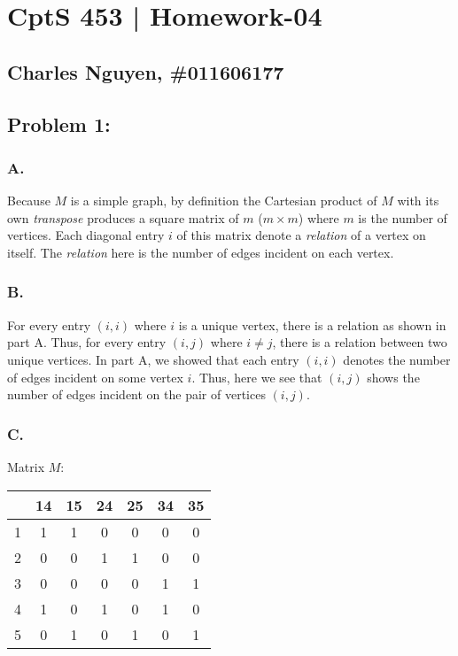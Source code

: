 \documentclass[12pt,letterpaper]{article}
\begin{document}
\section*{CptS 453 | Homework-04 }
\subsection*{Charles Nguyen, \#011606177 }

\subsection*{Problem 1:}
\subsubsection*{A.}
Because $M$ is a simple graph, by definition the Cartesian product of $M$ with
its own \emph{transpose} produces a square matrix of $m$ ($m \times m$) where
$m$ is the number of vertices.  Each diagonal entry $i$ of this matrix denote
a \emph{relation} of a vertex on itself. The \emph{relation} here is the
number of edges incident on each vertex.

\subsubsection*{B.}
For every entry $(i, i)$ where $i$ is a unique vertex, there is a relation
as shown in part A. Thus, for every entry $(i, j)$ where $i \neq j$, there is
a relation between two unique vertices. In part A, we showed that each entry
$(i, i)$ denotes the number of edges incident on some vertex $i$. Thus, here
we see that $(i, j)$ shows the number of edges incident on the pair of
vertices $(i, j)$.

\subsubsection*{C.}
Matrix $M$:
\begin{flushright}
\begin{tabular}{|*{7}{c|}}
      \hline
      & 14 & 15 & 24 & 25 & 34 & 35\\
      \hline
    1 & 1  & 1  & 0  & 0  & 0  & 0\\
      \hline
    2 & 0  & 0  & 1  & 1  & 0  & 0\\
      \hline
    3 & 0  & 0  & 0  & 0  & 1  & 1\\
      \hline
    4 & 1  & 0  & 1  & 0  & 1  & 0\\
      \hline
    5 & 0  & 1  & 0  & 1  & 0  & 1\\
      \hline
\end{tabular}
\end{flushright}
\end{document}
